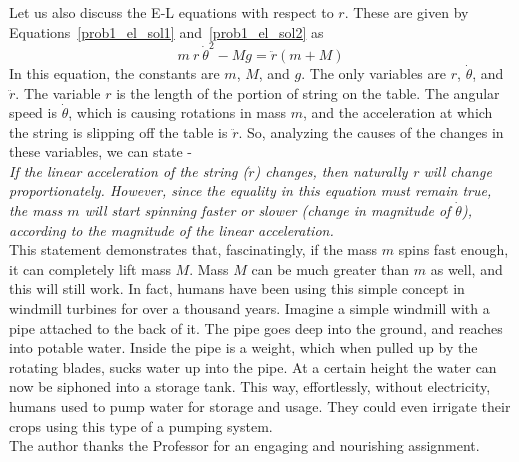 \documentclass[conference]{IEEEtran}
\begin{document}
Let us also discuss the E-L equations with respect to $r$. These are given by Equations~\ref{prob1_el_sol1}
and~\ref{prob1_el_sol2} as
\[
    m~r~\dot{\theta}^2 - Mg = \ddot{r}(m + M)
\]
In this equation, the constants are $m$, $M$, and $g$. The only variables are $r$, $\dot{\theta}$, and
$\ddot{r}$. The variable $r$ is the length of the portion of string on the table. The angular speed is
$\dot{\theta}$, which is causing rotations in mass $m$, and the acceleration at which the string is slipping off
the table is $\ddot{r}$. So, analyzing the causes of the changes in these variables, we can state -\\
\textit{If the linear acceleration of the string ($\ddot{r}$) changes, then naturally r will change proportionately.
However, since the equality in this equation must remain true, the mass $m$
will start spinning faster or slower (change in magnitude of $\dot{\theta}$), according
to the magnitude of the linear acceleration.}\\

This statement demonstrates that, fascinatingly, if the mass $m$ spins fast enough, it can completely
lift mass $M$. Mass $M$ can be much greater than $m$ as well, and this will still work. In fact,
humans have been using this simple concept in windmill turbines for over a thousand years. Imagine
a simple windmill with a pipe attached to the back of it. The pipe goes deep into the ground, and
reaches into potable water. Inside the pipe is a weight, which when pulled up by the rotating blades,
sucks water up into the pipe. At a certain height the water can now be siphoned into a storage
tank. This way, effortlessly, without electricity, humans used to pump water for storage and usage.
They could even irrigate their crops using this type of a pumping system.\\

The author thanks the Professor for an engaging and nourishing assignment.



\end{document}
